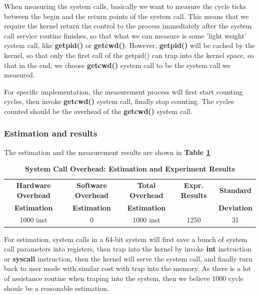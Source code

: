 When measuring the system calls, basically we want to measure the cycle ticks between the begin and the return points of the system call. This means that we require the kernel return the control to the process immediately after the system call service routine finishes, so that what we can measure is some 'light weight' system call, like \textbf{getpid()} or \textbf{getcwd()}. However, \textbf{getpid()} will be cached by the kernel, so that only the first call of the getpid() can trap into
the kernel space, so that in the end, we choose \textbf{getcwd()} system call to be the system call we measured.

For specific implementation, the measurement process will first start counting cycles, then invoke \textbf{getcwd()} system call, finally stop counting. The cycles counted should be the overhead of the \textbf{getcwd()} system call.


\subsubsection{Estimation and results}

The estimation and the measurement results are shown in \textbf{Table \ref{measurement_syscall_table}}

\begin{table}[ht]
  \centering
  \caption{\textbf{System Call Overhead: Estimation and Experiment Results}}
  \begin{threeparttable}
  \begin{tabular}{ccccc}
  \hline
      \textbf{Hardware Overhead} & \textbf{Software Overhead } & \textbf{Total Overhead} & \textbf{Expr. Results} & \textbf{Standard}\\
      \textbf{Estimation}       &  \textbf{Estimation}         & \textbf{Estimation}  &     & \textbf{Deviation}\\
  \hline
  1000 inst & 0 & 1000 inst & 1250 & 31 \\
  \hline
  \end{tabular}
  \end{threeparttable}
  \label{measurement_syscall_table}
\end{table}

For estimation, system calls in a 64-bit system will first save a bunch of system call parameters into registers, then trap into the kernel by invoke \textbf{int} instruction or \textbf{syscall} instruction, then the kernel will serve the system call, and finally turn back to user mode with similar cost with trap into the memory. As there is a lot of assistance routine when traping into the system, then we believe 1000 cycle shoule be a reasonable estimation.

